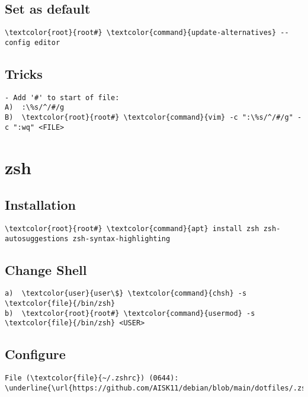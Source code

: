 \documentclass[10pt, a4paper, onecolumn, openany]{book} %
\begin{document}
\subsection{Set as default}
\begin{Verbatim}[commandchars=\\\{\}]
    \textcolor{root}{root#} \textcolor{command}{update-alternatives} --config editor
\end{Verbatim}
\subsection{Tricks}
\begin{Verbatim}[commandchars=\\\{\}]
- Add '#' to start of file:
A)  :\%s/^/#/g
B)  \textcolor{root}{root#} \textcolor{command}{vim} -c ":\%s/^/#/g" -c ":wq" <FILE>
\end{Verbatim}


\section{zsh}
\subsection{Installation}
\begin{Verbatim}[commandchars=\\\{\}]
    \textcolor{root}{root#} \textcolor{command}{apt} install zsh zsh-autosuggestions zsh-syntax-highlighting
\end{Verbatim}
\subsection{Change Shell}
\begin{Verbatim}[commandchars=\\\{\}]
a)  \textcolor{user}{user\$} \textcolor{command}{chsh} -s \textcolor{file}{/bin/zsh}
b)  \textcolor{root}{root#} \textcolor{command}{usermod} -s \textcolor{file}{/bin/zsh} <USER>
\end{Verbatim}
\subsection{Configure}
\begin{Verbatim}[commandchars=\\\{\}]
File (\textcolor{file}{~/.zshrc}) (0644):
\underline{\url{https://github.com/AISK11/debian/blob/main/dotfiles/.zshrc}}
\end{Verbatim}
\end{document}
